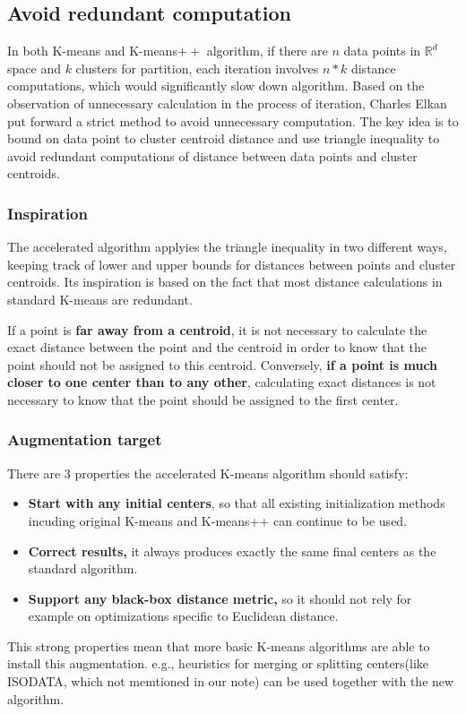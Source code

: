 \documentclass[11pt]{article}
\begin{document}
\subsection{Avoid redundant computation}
In both K-means and K-means$++$ algorithm, if there are $n$ data points in $\mathbb{R}^ d$ space and $k$ clusters for partition, each iteration involves $n * k$ distance computations, which would significantly slow down algorithm. Based on the observation of  unnecessary calculation in the process of iteration, Charles Elkan put forward a strict method to avoid unnecessary computation.\cite{articleToBound} The key idea is to bound on data point to cluster centroid distance and use triangle inequality to avoid redundant computations of distance between data points and cluster centroids.

\subsubsection{Inspiration}
The accelerated algorithm applyies the triangle inequality in two different ways, keeping track of lower and upper bounds for distances between points and cluster centroids. Its inspiration is based on the fact that most distance calculations in standard K-means are redundant. \par
If a point is \textbf{far away from a centroid}, it is not necessary to calculate the exact distance between the point and the centroid in order to know that the point should not be assigned to this centroid. Conversely, \textbf{if a point is much closer to one center than to any other}, calculating exact distances is not necessary to know that the point should be assigned to the first center. 
\subsubsection{Augmentation target}
There are 3 properties the accelerated K-means algorithm should satisfy:
\begin{itemize}
\item \textbf{Start with any initial centers}, so that all existing initialization methods incuding original K-means and K-means++ can continue to be used.
\item \textbf{Correct results, } it always produces exactly the same final centers as the standard  algorithm.
\item \textbf{Support any black-box distance metric,} so it should not rely for example on optimizations specific to Euclidean distance.
\end{itemize} \par
This strong properties mean that more basic K-means algorithms are able to install this augmentation. e.g., heuristics for merging or splitting centers(like  ISODATA, which not memtioned in our note) can be used together with the new algorithm.
\end{document}

